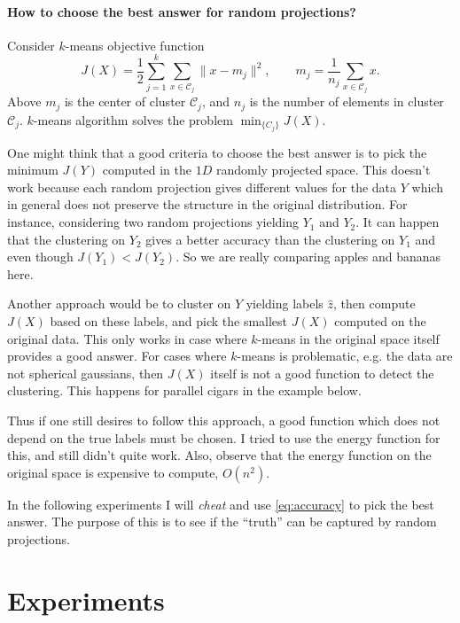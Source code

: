 \documentclass[aps,preprint,nofootinbib,floatfix]{revtex4-1}
\begin{document}
\paragraph*{How to choose the best answer for random projections?}
Consider $k$-means objective function
\begin{equation}
\label{eq:J}
J(X) = \dfrac{1}{2} \sum_{j=1}^k \sum_{x \in \mathcal{C}_j} \| x - m_j \|^2,
\qquad
m_j = \dfrac{1}{n_j}\sum_{x\in\mathcal{C}_j} x.
\end{equation}
Above $m_j$ is the center
of cluster $\mathcal{C}_j$, and 
$n_j$ is the number of elements in cluster $\mathcal{C}_j$. $k$-means
algorithm solves the problem $\min_{\{C_j\}} J(X)$. 

One might think
that a good criteria to choose the best answer is to pick the minimum $J(Y)$
computed in the $1D$ randomly projected space. This doesn't work because
each random projection gives different values for the data $Y$ which in general
does not preserve the structure in the original
distribution. For instance, considering two random projections yielding
$Y_1$ and $Y_2$. It can happen that the clustering on $Y_2$ gives a better
accuracy than the clustering on $Y_1$ and even though $J(Y_1) < J(Y_2)$.
So we are really comparing apples and bananas here.

Another approach would be to cluster on $Y$ yielding labels $\hat{z}$, then
compute $J(X)$ based on these labels, and pick the smallest $J(X)$  computed
on the original data. This only works in case where $k$-means in the original
space itself provides a good answer. For cases where $k$-means is problematic,
e.g. the data are not spherical gaussians, then $J(X)$ itself is not a good
function to detect the clustering. This happens for parallel cigars in the
example below.

Thus if one still desires to follow this approach, a good function which
does not depend on the true labels must be chosen. I tried to use the energy
function for this, and still didn't quite work. Also, observe that the 
energy function on the original space is expensive to compute, 
$O(n^2)$.

In the following experiments I will \emph{cheat} and use \eqref{eq:accuracy}
to pick the best answer. The purpose of this is to see if the ``truth'' can
be captured by random projections.

\section{Experiments}
\end{document}
